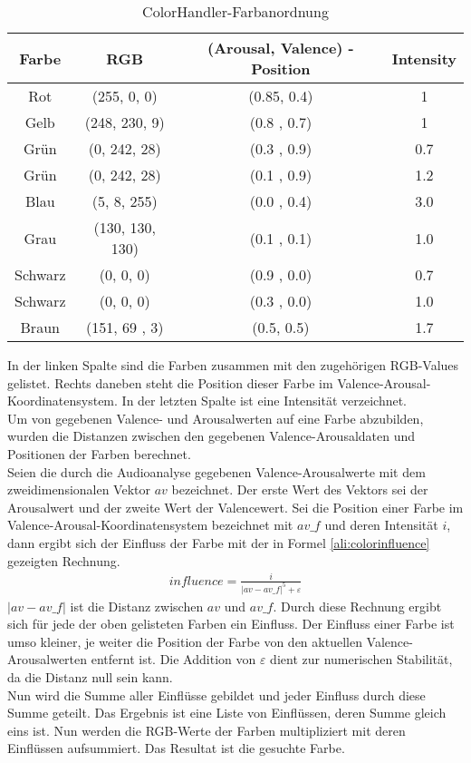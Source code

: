 \documentclass[11pt,a4paper]{article}
\begin{document}
\begin{table}[!ht]
\centering
\begin{tabular}{c | c | c | c}
	\textbf{Farbe} & \textbf{RGB} & (\textbf{Arousal}, \textbf{Valence}) -Position& \textbf{Intensity}\\
\hline
	Rot &	  (255, 0, 0) & (0.85, 0.4) & 1 \\ 
	Gelb &    (248, 230, 9) & (0.8 , 0.7) &  1 \\
	Grün &	  (0, 242, 28) & (0.3 , 0.9) &  0.7 \\
	Grün &	  (0, 242, 28) & (0.1 , 0.9) &  1.2 \\
	Blau &	  (5, 8, 255) & (0.0 , 0.4) &  3.0 \\
	Grau &	  (130, 130, 130) & (0.1 , 0.1) &  1.0 \\
	Schwarz & (0, 0, 0) & (0.9 , 0.0) &  0.7 \\
	Schwarz & (0, 0, 0) & (0.3 , 0.0) &  1.0 \\
	Braun &   (151, 69 , 3) & (0.5, 0.5) &  1.7 \\
\end{tabular}
\caption[ColorHandler Farbanordnung]{ColorHandler-Farbanordnung}
\label{tab:ColorHandlerFarbanordnung}
\end{table}
\noindent
In der linken Spalte sind die Farben zusammen mit den zugehörigen RGB-Values gelistet. Rechts daneben steht die Position dieser Farbe im Valence-Arousal-Koordinatensystem. In der letzten Spalte ist eine Intensität verzeichnet.\\
Um von gegebenen Valence- und Arousalwerten auf eine Farbe abzubilden, wurden die Distanzen zwischen den gegebenen Valence-Arousaldaten und Positionen der Farben berechnet.\\
Seien die durch die Audioanalyse gegebenen Valence-Arousalwerte mit dem zweidimensionalen Vektor $av$ bezeichnet. Der erste Wert des Vektors sei der Arousalwert und der zweite Wert der Valencewert. Sei die Position einer Farbe im Valence-Arousal-Koordinatensystem bezeichnet mit $av\_f$ und deren Intensität $i$, dann ergibt sich der Einfluss der Farbe mit der in Formel \ref{ali:colorinfluence} gezeigten Rechnung.
\begin{align}
influence = \frac{i}{\vert av - av\_f\vert^5 + \varepsilon}
\label{ali:colorinfluence}
\end{align}
\noindent
$\vert av - av\_f\vert$ ist die Distanz zwischen $av$ und $av\_f$. Durch diese Rechnung ergibt sich für jede der oben gelisteten Farben ein Einfluss. Der Einfluss einer Farbe ist umso kleiner, je weiter die Position der Farbe von den aktuellen Valence-Arousalwerten entfernt ist. Die Addition von $\varepsilon$ dient zur numerischen Stabilität, da die Distanz null sein kann.\\
Nun wird die Summe aller Einflüsse gebildet und jeder Einfluss durch diese Summe geteilt. Das Ergebnis ist eine Liste von Einflüssen, deren Summe gleich eins ist. Nun werden die RGB-Werte der Farben multipliziert mit deren Einflüssen aufsummiert. Das Resultat ist die gesuchte Farbe.
\end{document}
